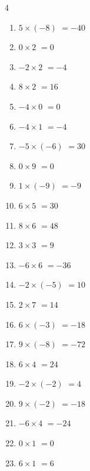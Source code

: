\begin{multicols}{4}
\begin{enumerate}
  \item $5\times (-8)$
        $=-40$

  \item $0\times 2$
        $=0$

  \item $-2\times 2$
        $=-4$

  \item $8\times 2$
        $=16$

  \item $-4\times 0$
        $=0$

  \item $-4\times 1$
        $=-4$

  \item $-5\times (-6)$
        $=30$

  \item $0\times 9$
        $=0$

  \item $1\times (-9)$
        $=-9$

  \item $6\times 5$
        $=30$

  \item $8\times 6$
        $=48$

  \item $3\times 3$
        $=9$

  \item $-6\times 6$
        $=-36$

  \item $-2\times (-5)$
        $=10$

  \item $2\times 7$
        $=14$

  \item $6\times (-3)$
        $=-18$

  \item $9\times (-8)$
        $=-72$

  \item $6\times 4$
        $=24$

  \item $-2\times (-2)$
        $=4$

  \item $9\times (-2)$
        $=-18$

  \item $-6\times 4$
        $=-24$

  \item $0\times 1$
        $=0$

  \item $6\times 1$
        $=6$


\end{enumerate}
\end{multicols}
